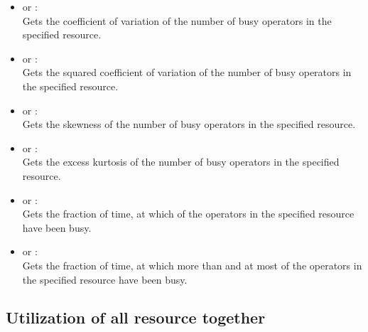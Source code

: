 \begin{itemize}
\item
{} or :\\
Gets the coefficient of variation of the number of busy operators in the specified resource.

\item
{} or :\\
Gets the squared coefficient of variation of the number of busy operators in the specified resource.

\item
{} or :\\
Gets the skewness of the number of busy operators in the specified resource.

\item
{} or :\\
Gets the excess kurtosis of the number of busy operators in the specified resource.

\item
{} or :\\
Gets the fraction of time, at which  of the operators in the specified resource have been busy.

\item
{} or :\\
Gets the fraction of time, at which more than  and at most  of the operators in the specified resource have been busy.

\end{itemize}



\subsection{Utilization of all resource together}

